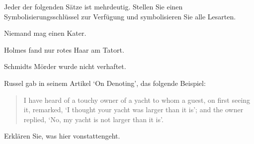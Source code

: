 \practiceproblems
\problempart
Jeder der folgenden Sätze ist mehrdeutig. Stellen Sie einen Symbolisierungsschlüssel zur Verfügung und symbolisieren Sie alle Lesarten.
\begin{earg}
	\item Niemand mag einen Kater.
	\item Holmes fand nur rotes Haar am Tatort.
	\item Schmidts Mörder wurde nicht verhaftet.
\end{earg}

\problempart
Russel gab in seinem Artikel `On Denoting', das folgende Beispiel:
\begin{quote}
	I have heard of a touchy owner of a yacht to whom a guest, on first seeing it, remarked, `I thought your yacht was larger than it is'; and the owner replied, `No, my yacht is not larger than it is'. 
\end{quote}
Erklären Sie, was hier vonstattengeht.
